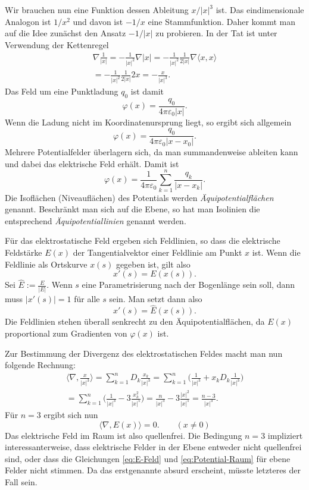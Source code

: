 \documentclass[a4paper,10pt,fleqn,twocolumn,twoside,dvipdfmx]{scrartcl}
\begin{document}
Wir brauchen nun eine Funktion dessen Ableitung
$x/|x|^3$ ist. Das eindimensionale Analogon
ist $1/x^2$ und davon ist $-1/x$ eine Stammfunktion.
Daher kommt man auf die Idee zunächst den Ansatz
$-1/|x|$ zu probieren. In der Tat ist
unter Verwendung der Kettenregel%
\begin{gather*}
\nabla\frac{1}{|x|} = -\frac{1}{|x|^2}\nabla |x|
= -\frac{1}{|x|^2}\frac{1}{2|x|}\nabla\langle x,x\rangle\\
= -\frac{1}{|x|^2}\frac{1}{2|x|}2x
= -\frac{x}{|x|^3}.
\end{gather*}
Das Feld um eine Punktladung $q_0$ ist damit%
\begin{equation}\label{eq:Potential-Raum}
\varphi(x) = \frac{q_0}{4\pi\varepsilon_0|x|}.
\end{equation}
Wenn die Ladung nicht im Koordinatenursprung liegt, so ergibt
sich allgemein%
\[\varphi(x) = \frac{q_0}{4\pi\varepsilon_0|x-x_0|}.\]
Mehrere Potentialfelder überlagern sich, da man summandenweise
ableiten kann und dabei das elektrische Feld erhält.
Damit ist%
\[\varphi(x) = \frac{1}{4\pi\varepsilon_0}
\sum_{k=1}^n \frac{q_k}{|x-x_k|}.\]
Die Isoflächen (Niveauflächen)
des Potentials werden \emph{Äquipotentialflächen} genannt.
Beschränkt man sich auf die Ebene, so hat man Isolinien die
entsprechend \emph{Äquipotentiallinien} genannt werden.

Für das elektrostatische Feld ergeben sich Feldlinien, so dass
die elektrische Feldstärke $E(x)$ der Tangentialvektor
einer Feldlinie am Punkt $x$ ist. Wenn die Feldlinie als
Ortskurve $x(s)$ gegeben ist, gilt also%
\[x'(s)=E(x(s)).\]
Sei $\hat E:=\frac{E}{|E|}$. Wenn $s$ eine Parametrisierung nach
der Bogenlänge sein soll, dann muss $|x'(s)|=1$ für alle $s$ sein.
Man setzt dann also%
\[x'(s)=\hat E(x(s)).\]
Die Feldlinien stehen überall senkrecht zu den Äquipotentialflächen,
da $E(x)$ proportional zum Gradienten von $\varphi(x)$ ist.

Zur Bestimmung der Divergenz des elektrostatischen Feldes macht man
nun folgende Rechnung:%
\begin{gather*}
\langle\nabla,\frac{x}{|x|^3}\rangle
= \sum_{k=1}^n D_k\frac{x_k}{|x|^3}
= \sum_{k=1}^n \bigg(\frac{1}{|x|^3}+x_kD_k\frac{1}{|x|^3}\bigg)\\
= \sum_{k=1}^n \bigg(\frac{1}{|x|^3}-3\frac{x_k^2}{|x|^5}\bigg)
= \frac{n}{|x|^3}-3\frac{|x|^2}{|x|^5}
= \frac{n-3}{|x|^3}.
\end{gather*}
Für $n=3$ ergibt sich nun
\begin{equation}\label{eq:quellenfrei}
\langle\nabla,E(x)\rangle = 0.\qquad (x\ne 0)
\end{equation}
Das elektrische Feld im Raum ist also quellenfrei.
Die Bedingung $n=3$ impliziert interessanterweise, dass elektrische
Felder in der Ebene entweder nicht quellenfrei sind, oder dass
die Gleichungen \eqref{eq:E-Feld} und \eqref{eq:Potential-Raum} für
ebene Felder nicht stimmen. Da das erstgenannte absurd erscheint,
müsste letzteres der Fall sein.
\end{document}
